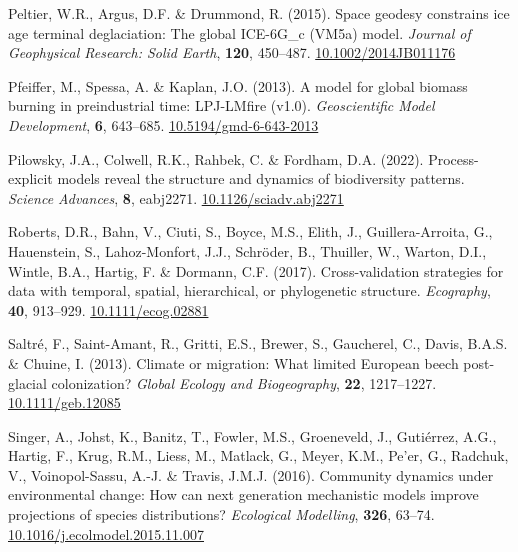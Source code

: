\documentclass[11pt,]{article}
\newlength{\cslhangindent}
\newenvironment{CSLReferences}[2] %
 {%
  \setlength{\parindent}{0pt}
  \ifodd #1 \everypar{\setlength{\hangindent}{\cslhangindent}}\ignorespaces\fi
  \ifnum #2 > 0
  \setlength{\parskip}{#2\baselineskip}
  \fi
 }%
 {}
\begin{document}
\begin{CSLReferences}{1}{0}
\leavevmode{}%
Peltier, W.R., Argus, D.F. \& Drummond, R. (2015). Space geodesy
constrains ice age terminal deglaciation: {The} global {ICE}-{6G}\_c
({VM5a}) model. \emph{Journal of Geophysical Research: Solid Earth},
\textbf{120}, 450--487.
\href{https://doi.org/10.1002/2014JB011176}{10.1002/2014JB011176}

\leavevmode{}%
Pfeiffer, M., Spessa, A. \& Kaplan, J.O. (2013). A model for global
biomass burning in preindustrial time: LPJ-LMfire (v1.0).
\emph{Geoscientific Model Development}, \textbf{6}, 643--685.
\href{https://doi.org/10.5194/gmd-6-643-2013}{10.5194/gmd-6-643-2013}

\leavevmode{}%
Pilowsky, J.A., Colwell, R.K., Rahbek, C. \& Fordham, D.A. (2022).
Process-explicit models reveal the structure and dynamics of
biodiversity patterns. \emph{Science Advances}, \textbf{8}, eabj2271.
\href{https://doi.org/10.1126/sciadv.abj2271}{10.1126/sciadv.abj2271}

\leavevmode{}%
Roberts, D.R., Bahn, V., Ciuti, S., Boyce, M.S., Elith, J.,
Guillera-Arroita, G., Hauenstein, S., Lahoz-Monfort, J.J., Schröder, B.,
Thuiller, W., Warton, D.I., Wintle, B.A., Hartig, F. \& Dormann, C.F.
(2017). Cross-validation strategies for data with temporal, spatial,
hierarchical, or phylogenetic structure. \emph{Ecography}, \textbf{40},
913--929. \href{https://doi.org/10.1111/ecog.02881}{10.1111/ecog.02881}

\leavevmode{}%
Saltré, F., Saint-Amant, R., Gritti, E.S., Brewer, S., Gaucherel, C.,
Davis, B.A.S. \& Chuine, I. (2013). Climate or migration: What limited
{European} beech post-glacial colonization? \emph{Global Ecology and
Biogeography}, \textbf{22}, 1217--1227.
\href{https://doi.org/10.1111/geb.12085}{10.1111/geb.12085}

\leavevmode{}%
Singer, A., Johst, K., Banitz, T., Fowler, M.S., Groeneveld, J.,
Gutiérrez, A.G., Hartig, F., Krug, R.M., Liess, M., Matlack, G., Meyer,
K.M., Pe'er, G., Radchuk, V., Voinopol-Sassu, A.-J. \& Travis, J.M.J.
(2016). Community dynamics under environmental change: {How} can next
generation mechanistic models improve projections of species
distributions? \emph{Ecological Modelling}, \textbf{326}, 63--74.
\href{https://doi.org/10.1016/j.ecolmodel.2015.11.007}{10.1016/j.ecolmodel.2015.11.007}


\end{CSLReferences}
\end{document}
